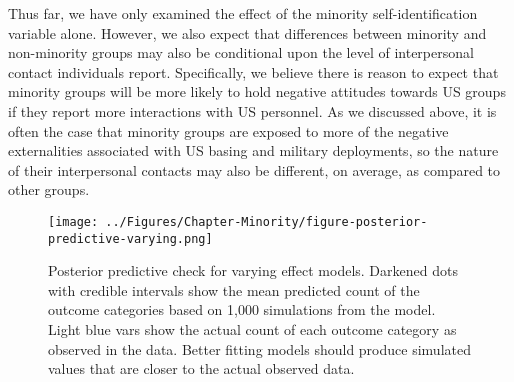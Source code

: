 Thus far, we have only examined the effect of the minority self-identification variable alone. However, we also expect that differences between minority and non-minority groups may also be conditional upon the level of interpersonal contact individuals report. Specifically, we believe there is reason to expect that minority groups will be more likely to hold negative attitudes towards US groups if they report more interactions with US personnel. As we discussed above, it is often the case that minority groups are exposed to more of the negative externalities associated with US basing and military deployments, so the nature of their interpersonal contacts may also be different, on average, as compared to other groups. 


\begin{sidewaysfigure}[h!p]
	\centering\texttt{[image: ../Figures/Chapter-Minority/figure-posterior-predictive-varying.png]}
	\caption{Posterior predictive check for varying effect models. Darkened dots with credible intervals show the mean predicted count of the outcome categories based on 1,000 simulations from the model. Light blue vars show the actual count of each outcome category as observed in the data. Better fitting models should produce simulated values that are closer to the actual observed data.}
	\label{fig:minorityvaryingppcheck}
\end{sidewaysfigure}



